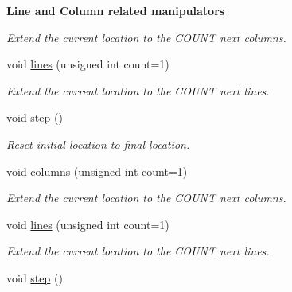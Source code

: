 \begin{Indent}{\bf Line and Column related manipulators}
\begin{DoxyCompactItemize}
\begin{DoxyCompactList}\small\item\em Extend the current location to the C\-O\-U\-N\-T next columns. \end{DoxyCompactList}\item 
\hypertarget{classyy_1_1location_af05c5d78c5a53fb3aa4ef4e34c9eb723}{void \hyperlink{classyy_1_1location_af05c5d78c5a53fb3aa4ef4e34c9eb723}{lines} (unsigned int count=1)}\label{classyy_1_1location_af05c5d78c5a53fb3aa4ef4e34c9eb723}

\begin{DoxyCompactList}\small\item\em Extend the current location to the C\-O\-U\-N\-T next lines. \end{DoxyCompactList}\item 
\hypertarget{classyy_1_1location_a96620cec8dd8ebfc96c60a03c10154d0}{void \hyperlink{classyy_1_1location_a96620cec8dd8ebfc96c60a03c10154d0}{step} ()}\label{classyy_1_1location_a96620cec8dd8ebfc96c60a03c10154d0}

\begin{DoxyCompactList}\small\item\em Reset initial location to final location. \end{DoxyCompactList}\item 
\hypertarget{classyy_1_1location_a044d2ef2831243279beb5e1b93ffca39}{void \hyperlink{classyy_1_1location_a044d2ef2831243279beb5e1b93ffca39}{columns} (unsigned int count=1)}\label{classyy_1_1location_a044d2ef2831243279beb5e1b93ffca39}

\begin{DoxyCompactList}\small\item\em Extend the current location to the C\-O\-U\-N\-T next columns. \end{DoxyCompactList}\item 
\hypertarget{classyy_1_1location_af05c5d78c5a53fb3aa4ef4e34c9eb723}{void \hyperlink{classyy_1_1location_af05c5d78c5a53fb3aa4ef4e34c9eb723}{lines} (unsigned int count=1)}\label{classyy_1_1location_af05c5d78c5a53fb3aa4ef4e34c9eb723}

\begin{DoxyCompactList}\small\item\em Extend the current location to the C\-O\-U\-N\-T next lines. \end{DoxyCompactList}\item 
\hypertarget{classyy_1_1location_a96620cec8dd8ebfc96c60a03c10154d0}{void \hyperlink{classyy_1_1location_a96620cec8dd8ebfc96c60a03c10154d0}{step} ()}\label{classyy_1_1location_a96620cec8dd8ebfc96c60a03c10154d0}


\end{DoxyCompactItemize}
\end{Indent}
